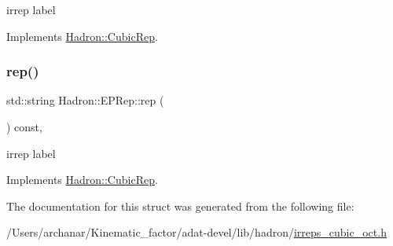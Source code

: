 irrep label 

Implements \mbox{\hyperlink{structHadron_1_1CubicRep_ac3eb63608803d44c68681f158e14eb1b}{Hadron\+::\+Cubic\+Rep}}.

\mbox{\label{structHadron_1_1EPRep_aa5bf2023752cfb939ced1f054cfd588f}} 
\subsubsection{\texorpdfstring{rep()}{rep()}\hspace{0.1cm}{\footnotesize\ttfamily [3/3]}}
{\footnotesize\ttfamily std\+::string Hadron\+::\+E\+P\+Rep\+::rep (\begin{DoxyParamCaption}{ }\end{DoxyParamCaption}) const\hspace{0.3cm}{\ttfamily [inline]}, {\ttfamily [virtual]}}

irrep label 

Implements \mbox{\hyperlink{structHadron_1_1CubicRep_ac3eb63608803d44c68681f158e14eb1b}{Hadron\+::\+Cubic\+Rep}}.



The documentation for this struct was generated from the following file\+:\begin{DoxyCompactItemize}
\item 
/\+Users/archanar/\+Kinematic\+\_\+factor/adat-\/devel/lib/hadron/\mbox{\hyperlink{adat-devel_2lib_2hadron_2irreps__cubic__oct_8h}{irreps\+\_\+cubic\+\_\+oct.\+h}}\end{DoxyCompactItemize}
